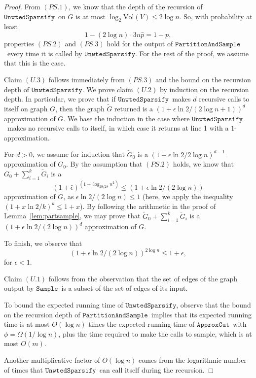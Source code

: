 \documentclass[11pt]{article}
\newcommand{\unwtedsparsify}{\ensuremath{\mathtt{UnwtedSparsify}}}
\newcommand{\sample}{\ensuremath{\mathtt{Sample}}}
\newcommand{\approxcut}{\ensuremath{\mathtt{ApproxCut}}}
\newcommand{\partsample}{\ensuremath{\mathtt{PartitionAndSample}}}
\def\Gtil{\widetilde{G}}
\def\phat{\hat{p}}
\def\epshat{\hat{\epsilon}}
\def\vol#1{\mathrm{Vol}\left(#1  \right)}
\begin{document}
\begin{proof}
From $(PS.1)$, we know that the depth of the recursion of
  \unwtedsparsify \ on $G$ is at most $\log_{2} \vol{V} \leq 2 \log n$.
So, with probability at least
\[
  1 - (2 \log n) \cdot 3 n \phat = 1- p,
\]
properties $(PS.2)$ and $(PS.3)$ hold for the output of
  \partsample \ every time it is called by \unwtedsparsify.
For the rest of the proof, we assume that this is the case.

Claim $(U.3)$ follows immediately from $(PS.3)$ and the bound on the
  recursion depth of \unwtedsparsify .
We prove claim $(U.2)$ by induction on the recursion depth.
In particular, we prove that if \unwtedsparsify \ makes $d$ recursive
  calls to itself on graph $G$, then the graph $\Gtil$ returned is
  a $(1+\epsilon \ln 2 / (2 \log n + 1))^{d}$ approximation of $G$.
We base the induction in the case where \unwtedsparsify \ makes no
  recursive calls to itself, in which case it returns at line 1
  with a $1$-approximation.

For $d > 0$, we assume for induction that $\Gtil_{0}$ is a
  $(1+\epsilon \ln 2 / 2 \log n)^{d-1}$-approximation of $G_{0}$.
By the assumption that $(PS.2)$ holds, we know that
  $G_{0} + \sum_{i=1}^{k} \Gtil_{i}$
  is a
\[
  (1 + \epshat)^{(1 + \log_{29/28}  n^{2})}
 \leq
  (1 + \epsilon \ln 2/ (2 \log n ))
\]
approximation of $G$, as $\epsilon \ln 2 / (2 \log n) \leq 1$
  (here, we apply the inequality $(1 + x \ln 2 / k)^{k} \leq 1+x$).
By following the arithmetic in the proof of Lemma~\ref{lem:partsample},
  we may prove that
$\Gtil _{0} + \sum_{i=1}^{k} \Gtil_{i}$
  is a $(1+\epsilon \ln 2/ (2 \log n))^{d}$ approximation of $G$.

To finish, we observe that
\[
(1+\epsilon \ln 2 / (2 \log n ))^{2 \log n} \leq 1 + \epsilon ,
\]
for $\epsilon < 1$.

Claim $(U.1)$ follows from the observation that the set of edges of
  the graph output by \sample \ is a subset of the set of edges of its input.

To bound the expected running time of \unwtedsparsify,
  observe that the bound on the recursion depth of
  \partsample \ implies that its expected running time is at most
  $O (\log n)$ times the expected running time
  of \approxcut \ with $\phi = \Omega(1/\log n)$,
  plus the time required to make the calls
  to sample, which is at most $O (m)$.

Another multiplicative factor of $O (\log n)$ comes from the
  logarithmic number of times that \unwtedsparsify \ can call
  itself during the recursion.
\end{proof}
\end{document}

